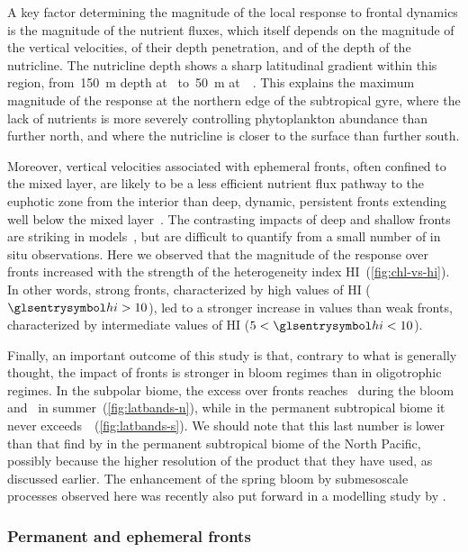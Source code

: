 A key factor determining the magnitude of the local  response to frontal dynamics is the magnitude of the nutrient fluxes, which itself depends on the magnitude of the vertical velocities, of their depth penetration, and of the depth of the nutricline.
The nutricline depth shows a sharp latitudinal gradient within this region, from~\qty{150}{\m} depth at~ to~\qty{50}{\m} at~~\parencite{romera-castillo_2016}.
This explains the maximum magnitude of the  response at the northern edge of the subtropical gyre, where the lack of nutrients is more severely controlling phytoplankton abundance than further north, and where the nutricline is closer to the surface than further south.

Moreover, vertical velocities associated with ephemeral fronts, often confined to the mixed layer, are likely to be a less efficient nutrient flux pathway to the euphotic zone from the interior than deep, dynamic, persistent fronts extending well below the mixed layer~\parencite{levy_2018}.
The contrasting impacts of deep and shallow fronts are striking in models~\parencite{levy_2012}, but are difficult to quantify from a small number of in situ observations.
Here we observed that the magnitude of the  response over fronts increased with the strength of the heterogeneity index HI~(\cref{fig:chl-vs-hi}).
In other words, strong fronts, characterized by high values of HI (\(\am{hi} > 10\)), led to a stronger increase in  values than weak fronts, characterized by intermediate values of HI (\(5 < \am{hi} < 10\)).

Finally, an important outcome of this study is that, contrary to what is generally thought, the impact of fronts is stronger in bloom regimes than in oligotrophic regimes.
In the subpolar biome, the   excess over fronts reaches~ during the bloom and~ in summer~(\cref{fig:latbands-n}), while in the permanent subtropical biome it never exceeds~~(\cref{fig:latbands-s}).
We should note that this last number is lower than that find by \textcite{liu_2016} in the permanent subtropical biome of the North Pacific, possibly because the higher resolution of the product that they have used, as discussed earlier.
The enhancement of the spring bloom by submesoscale processes observed here was recently also put forward in a modelling study by \textcite{simoes-sousa_2022}.

\subsubsection{Permanent and ephemeral fronts}

